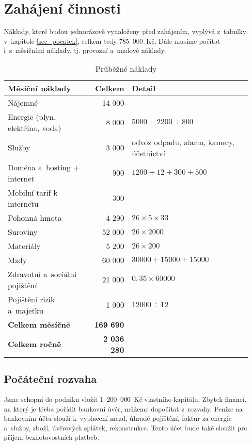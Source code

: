 \section{Zahájení činnosti}
Náklady, které budou jednorázově vynaloženy před zahájením, vyplývá z~tabulky v~kapitole \ref{sec_pocatek}, celkem tedy 785~000~Kč. Dále musíme počítat i~s~měsíčními náklady, tj. provozní a~mzdové náklady.


\begin{table}[htbp]
\begin{center}
\begin{tabular}{ l r l }

\textbf{Měsíční náklady\index{náklad}} & \textbf{Celkem} & \textbf{Detail} \\ \hline 
Nájemné & 14 000 & \\ 
Energie (plyn, elektřina, voda) & 8 000 & $5000 + 2200 + 800$ \\ 
Služby & 3 000 & odvoz odpadu, alarm, kamery, účetnictví\\ 
Doména a~hosting + internet & 900 & $1200 \div 12 + 300 + 500$ \\ 
Mobilní tarif k internetu & 300 & \\ 
Pohonná hmota & 4 290 & $26 \times 5 \times 33$ \\ 
Suroviny & 52 000 & $26 \times 2 000$ \\ 
Materiály & 5 200 & $26 \times 200$ \\ 
Mzdy\index{mzda} & 60 000 & $30000 + 15000 + 15000$ \\ 
Zdravotní a~sociální pojištění & 21 000 & $0,35 \times 60 000$ \\ 
Pojištění rizik a~majetku & 1 000 & $12 000 \div 12$\\ \hline 
\textbf{Celkem měsíčně} & \textbf{169 690} & \\ 
\textbf{Celkem ročně} & \textbf{2 036 280} & \\

\end{tabular}
\caption{Průběžné náklady}
\label{prubezne_naklady}
\end{center}
\end{table}

\subsection{Počáteční rozvaha}
Jsme schopni do podniku vložit 1~200~000~Kč vlastního kapitálu. Zbytek financí, na který je třeba pořídit bankovní úvěr, můžeme dopočítat z~rozvahy. Peníze na bankovním účtu slouží k~vyplacení mezd, úhradě pojištění, faktur za energie a~služby, zboží, úvěrových splátek, rekonstrukce. Tento účet bude také sloužit pro příjem bezhotovostních platbeb.

